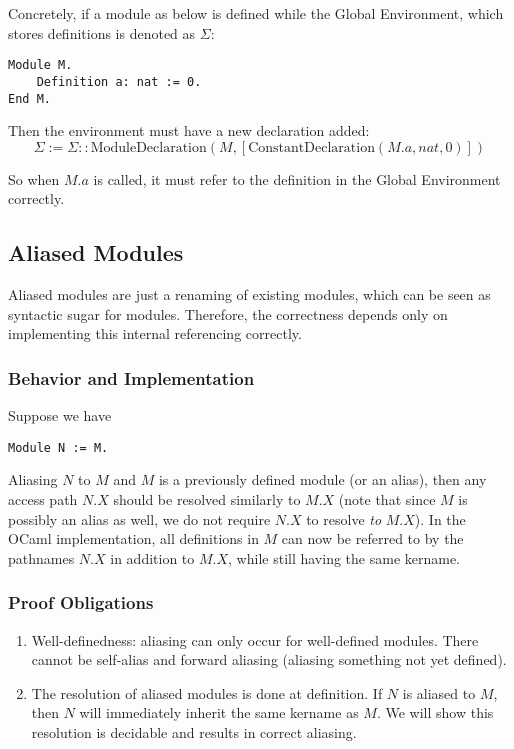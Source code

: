 Concretely, if a module as below is defined while the Global Environment, which
stores definitions is denoted as $\Sigma$:
\begin{verbatim}
Module M.
    Definition a: nat := 0.
End M.
\end{verbatim}
Then the environment must have a new declaration added:
\[\Sigma := \Sigma :: \text{ModuleDeclaration}(M,
[\text{ConstantDeclaration}(M.a, nat, 0)])\]

So when $M.a$ is called, it must refer to the definition in the Global
Environment correctly.

\subsection{Aliased Modules}
Aliased modules are just a renaming of existing modules, which can be seen as
syntactic sugar for modules. Therefore, the correctness depends only on
implementing this internal referencing correctly.

\subsubsection{Behavior and Implementation}
Suppose we have

\begin{verbatim}
Module N := M.
\end{verbatim}

Aliasing $N$ to $M$ and $M$ is a previously defined module (or an alias),
then any access path $N.X$ should be resolved similarly to
$M.X$ (note that since $M$ is possibly an alias as well, we do not require $N.X$
to resolve \emph{to} $M.X$). In the OCaml implementation, all definitions in $M$
can now be referred to by the pathnames $N.X$ in addition to $M.X$, while still
having the same kername.

\subsubsection{Proof Obligations}
\begin{enumerate}
\item Well-definedness: aliasing can only occur for well-defined modules. There
    cannot be self-alias and forward aliasing (aliasing something not yet defined).
\item The resolution of aliased modules is done at definition. If $N$ is aliased
    to $M$, then $N$ will immediately inherit the same kername as $M$. We will
    show this resolution is decidable and results in correct aliasing.
\end{enumerate}

